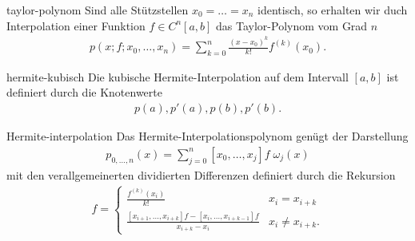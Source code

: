 \begin{Beispiel}{taylor-polynom}
  Sind alle Stützstellen $x_0 = \dots = x_n$ identisch, so erhalten
  wir duch Interpolation einer Funktion $f\in C^n[a,b]$ das
  Taylor-Polynom vom Grad $n$
  \begin{gather}
    p(x;f;x_0,\dots,x_n) = \sum_{k=0}^n \frac{(x-x_0)^k}{k!} f^{(k)}(x_0).
  \end{gather}
\end{Beispiel}

\begin{Beispiel}{hermite-kubisch}
  Die kubische Hermite-Interpolation auf dem Intervall $[a,b]$ ist
  definiert durch die Knotenwerte
  \begin{gather}
    p(a), p'(a), p(b), p'(b).
  \end{gather}
\end{Beispiel}

\begin{Satz}{Hermite-interpolation}
  Das Hermite-Interpolationspolynom genügt der Darstellung
  \begin{gather}
    p_{0,\dots,n}(x) = \sum_{j=0}^n [x_0,\dots,x_j]f\;\omega_j(x)
  \end{gather}
  mit den verallgemeinerten dividierten Differenzen definiert durch
  die Rekursion
  \begin{gather}
    [x_i,\dots,x_i+k]f =
    \begin{cases}
      \frac{f^{(k)}(x_i)}{k!} &x_i=x_{i+k}\\
      \frac{[x_{i+1},\dots,x_{i+k}]f - [x_i,\dots,x_{i+k-1}]f}{x_{i+k}-x_i}
      &x_i\neq x_{i+k}.
    \end{cases}
  \end{gather}
\end{Satz}

